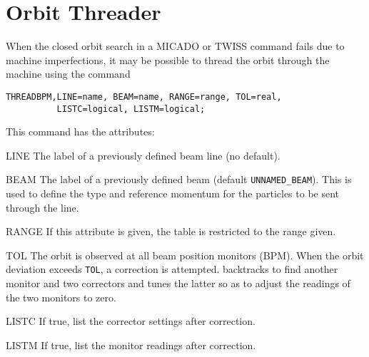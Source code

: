 \section{Orbit Threader}
\label{sec:thread}
When the closed orbit search in a {MICADO}  or
{TWISS}  command fails due to machine imperfections,
it may be possible to thread the orbit through the machine using the command
\begin{verbatim}
THREADBPM,LINE=name, BEAM=name, RANGE=range, TOL=real,
          LISTC=logical, LISTM=logical;
\end{verbatim}
This command has the attributes:
\begin{kdescription}
\item[LINE]
  The label of a previously defined beam line (no default).
\item[BEAM]
  The label of a previously defined beam (default \texttt{UNNAMED\_BEAM}).
  This is used to define the type and reference momentum for the
  particles to be sent through the line.
\item[RANGE]
  If this attribute is given, the table is restricted to the range given.
\item[TOL]
  The orbit is observed at all beam position monitors (BPM).
  When the orbit deviation exceeds \texttt{TOL},
  a correction is attempted.
  \opal backtracks to find another monitor and two correctors and tunes the
  latter so as to adjust the readings of the two monitors to zero.
\item[LISTC]
  If true, list the corrector settings after correction.
\item[LISTM]
  If true, list the monitor readings after correction.
\end{kdescription}

